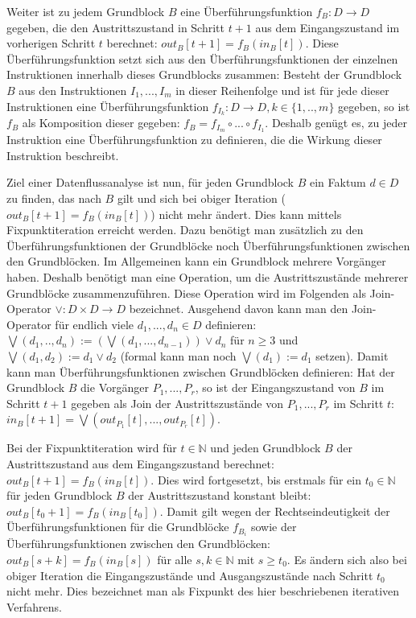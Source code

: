 Weiter ist zu jedem Grundblock $B$ eine Überführungsfunktion $f_B:D\to D$ gegeben, die den Austrittszustand in Schritt $t+1$ aus dem Eingangszustand im vorherigen Schritt $t$ berechnet: $out_B[t+1]=f_B(in_B[t])$.
Diese Überführungsfunktion setzt sich aus den Überführungsfunktionen der einzelnen Instruktionen innerhalb dieses Grundblocks zusammen:
Besteht der Grundblock $B$ aus den Instruktionen $I_1,...,I_m$ in dieser Reihenfolge und ist für jede dieser Instruktionen eine Überführungsfunktion $f_{I_k}:D\to D, k\in \{1,..,m\}$ gegeben, so ist $f_B$ als Komposition dieser gegeben: $f_B=f_{I_m}\circ ... \circ f_{I_1}$.
Deshalb genügt es, zu jeder Instruktion eine Überführungsfunktion zu definieren, die die Wirkung dieser Instruktion beschreibt.

Ziel einer Datenflussanalyse ist nun, für jeden Grundblock $B$ ein Faktum $d\in D$ zu finden, das nach $B$ gilt und sich bei obiger Iteration ($out_B[t+1]=f_B(in_B[t])$) nicht mehr ändert.
Dies kann mittels Fixpunktiteration erreicht werden.
Dazu benötigt man zusätzlich zu den Überführungsfunktionen der Grundblöcke noch Überführungsfunktionen zwischen den Grundblöcken.
Im Allgemeinen kann ein Grundblock mehrere Vorgänger haben.
Deshalb benötigt man eine Operation, um die Austrittszustände mehrerer Grundblöcke zusammenzuführen.
Diese Operation wird im Folgenden als Join-Operator $\vee :D\times D \to D$ bezeichnet.
Ausgehend davon kann man den Join-Operator für endlich viele $d_1,...,d_n \in D$ definieren: $\bigvee (d_1,..,d_n):=(\bigvee(d_1,...,d_{n-1})) \vee d_n$ für $n \geq 3$ und $\bigvee(d_1,d_2):=d_1 \vee d_2$ (formal kann man noch $\bigvee (d_1):=d_1$ setzen).
Damit kann man Überführungsfunktionen zwischen Grundblöcken definieren: 
Hat der Grundblock $B$ die Vorgänger $P_1,...,P_r$, so ist der Eingangszustand von $B$ im Schritt $t+1$ gegeben als Join der Austrittszustände von $P_1,...,P_r$ im Schritt $t$: $in_B[t+1]=\bigvee(out_{P_1}[t],...,out_{P_r}[t])$.

Bei der Fixpunktiteration wird für $t \in \mathbb{N}$ und jeden Grundblock $B$ der Austrittszustand aus dem Eingangszustand berechnet: $out_B[t+1]=f_B(in_B[t])$. 
Dies wird fortgesetzt, bis erstmals für ein $t_0 \in \mathbb{N}$ für jeden Grundblock $B$ der Austrittszustand konstant bleibt: $out_B[t_0+1]=f_B(in_B[t_0])$.
Damit gilt wegen der Rechtseindeutigkeit der Überführungsfunktionen für die Grundblöcke $f_{B_i}$ sowie der Überführungsfunktionen zwischen den Grundblöcken: $out_B[s+k]=f_B(in_B[s])$ für alle $s,k \in \mathbb{N}$ mit $s \geq t_0$.
Es ändern sich also bei obiger Iteration die Eingangszustände und Ausgangszustände nach Schritt $t_0$ nicht mehr.
Dies bezeichnet man als Fixpunkt des hier beschriebenen iterativen Verfahrens.

